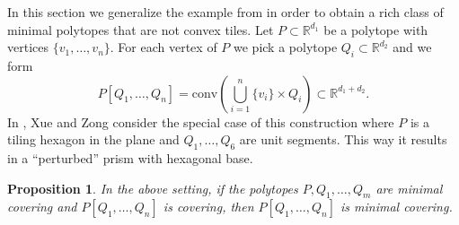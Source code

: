 \documentclass[11pt, a4paper]{amsart}
\newcommand{\RR}{\mathbb{R}}
\newcommand{\conv}{\mathrm{conv}}
\numberwithin{equation}{section}
\theoremstyle{plain}
\newtheorem{proposition}[theorem]{Proposition}
\begin{document}
In this section we generalize the example from \cite{xuezong} in order to obtain a rich class of minimal polytopes that are not convex tiles.
Let $P\subset\RR^{d_1}$ be a polytope with vertices $\{v_1,\dots,v_n\}$. For each vertex of $P$ we pick a polytope $Q_i\subset\RR^{d_2}$ and we form
\begin{equation}
\label{eq:wiggly_sums}
P[Q_1,\dots,Q_n] = \conv\left( \bigcup_{i=1}^n \{v_i\}\times Q_i\right) \subset\RR^{d_1+d_2}.
\end{equation}
In \cite{xuezong}, Xue and Zong consider the special case of this construction where $P$ is a tiling hexagon in the plane and $Q_1,\dots,Q_6$ are unit segments. This way it results in a ``perturbed'' prism with hexagonal base.
\begin{proposition}
\label{prop:wiggly_sums}
	In the above setting, if the polytopes $P,Q_1,\dots,Q_m$ are minimal covering and $P[Q_1,\dots,Q_n]$ is covering, then $P[Q_1,\dots,Q_n]$ is minimal covering.
\end{proposition}
\end{document}
